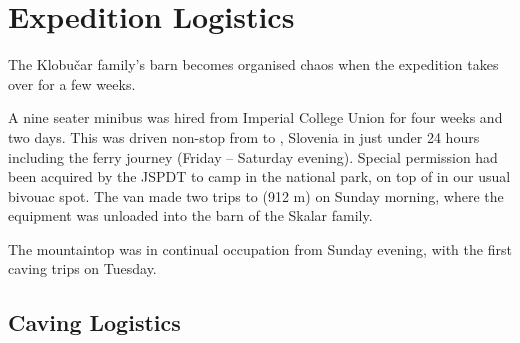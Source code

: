 \section{Expedition Logistics}


    \begin{marginfigure}
\checkoddpage \ifoddpage \forcerectofloat \else \forceversofloat \fi
\centering
 \caption{The Klobučar family's barn becomes organised chaos when the expedition takes over for a few weeks. }
 \label{Skalar barn}
\end{marginfigure}

A nine seater minibus was hired from Imperial College Union for four weeks and two days. 
This was driven
non-stop from  to , Slovenia in just under 24 hours
including the ferry journey (Friday -- Saturday evening). Special permission
had been acquired by the JSPDT to camp in the national park, on top of 
in our usual bivouac spot. The van made two trips to  (912 m) on
Sunday morning, where the equipment was unloaded into the barn of the Skalar
family. 

The mountaintop was in continual occupation from Sunday evening, with the first
caving trips on Tuesday.

\subsection{Caving Logistics}

